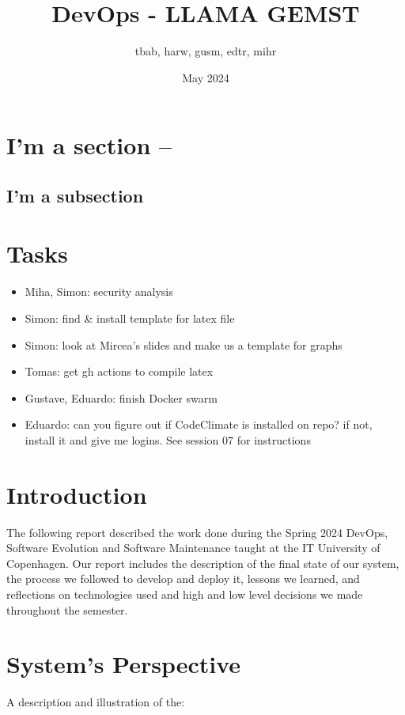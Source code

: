 \documentclass{article}
\title{DevOps - LLAMA GEMST}
\author{tbab, harw, gusm, edtr, mihr}
\date{May 2024}
\begin{document}
\maketitle

\section{I'm a section --}
\subsection{I'm a subsection}

\section{Tasks}

\begin{itemize}
  \item Miha, Simon: security analysis
  \item Simon: find \& install template for latex file
  \item Simon: look at Mircea's slides and make us a template for graphs
  \item Tomas: get gh actions to compile latex
  \item Gustave, Eduardo: finish Docker swarm
  \item Eduardo: can you figure out if CodeClimate is installed on repo? if not, install it and give me logins. See session 07 for instructions
\end{itemize}

\section{Introduction}
The following report described the work done during the Spring 2024 DevOps, Software Evolution and Software Maintenance taught at the IT University of Copenhagen. Our report includes the description of the final state of our system, the process we followed to develop and deploy it, lessons we learned, and reflections on technologies used and high and low level decisions we made throughout the semester.

\section{System's Perspective}

A description and illustration of the:
\end{document}
